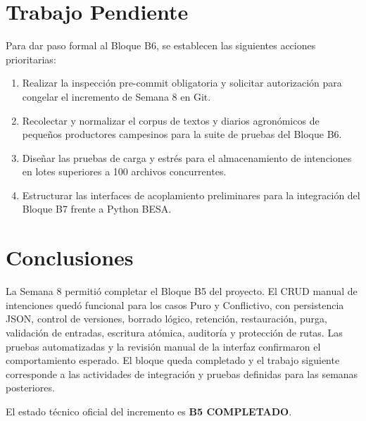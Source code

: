 \documentclass[11pt,a4paper]{article}
\begin{document}
\section{Trabajo Pendiente}

Para dar paso formal al Bloque B6, se establecen las siguientes acciones prioritarias:
\begin{enumerate}[itemsep=2pt]
    \item Realizar la inspección pre-commit obligatoria y solicitar autorización para congelar el incremento de Semana 8 en Git.
    \item Recolectar y normalizar el corpus de textos y diarios agronómicos de pequeños productores campesinos para la suite de pruebas del Bloque B6.
    \item Diseñar las pruebas de carga y estrés para el almacenamiento de intenciones en lotes superiores a 100 archivos concurrentes.
    \item Estructurar las interfaces de acoplamiento preliminares para la integración del Bloque B7 frente a Python BESA.
\end{enumerate}

\section{Conclusiones}

La Semana 8 permitió completar el Bloque B5 del proyecto. El CRUD manual de intenciones quedó funcional para los casos Puro y Conflictivo, con persistencia JSON, control de versiones, borrado lógico, retención, restauración, purga, validación de entradas, escritura atómica, auditoría y protección de rutas. Las pruebas automatizadas y la revisión manual de la interfaz confirmaron el comportamiento esperado. El bloque queda completado y el trabajo siguiente corresponde a las actividades de integración y pruebas definidas para las semanas posteriores.

El estado técnico oficial del incremento es \textbf{B5 COMPLETADO}.

\end{document}
